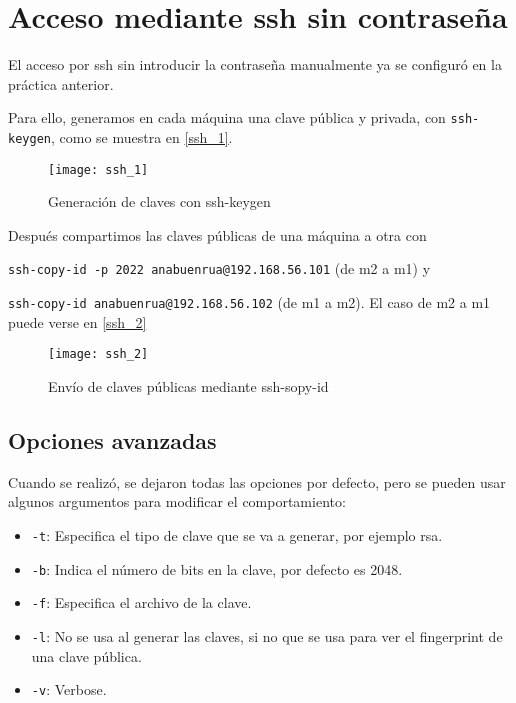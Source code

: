 \chapter{Acceso mediante ssh sin contraseña}

El acceso por ssh sin introducir la contraseña manualmente ya se configuró en la práctica anterior.

Para ello, generamos en cada máquina una clave pública y privada, con \verb|ssh-keygen|, como se muestra en \eqref{ssh_1}.

\begin{figure}[h!]
\begin{center}
\caption{Generación de claves con ssh-keygen}
\label{ssh_1}
\texttt{[image: ssh\_1]}
\end{center}
\end{figure}

Después compartimos las claves públicas de una máquina a otra con 

\verb|ssh-copy-id -p 2022 anabuenrua@192.168.56.101| (de m2 a m1) y

\verb|ssh-copy-id anabuenrua@192.168.56.102| (de m1 a m2). El caso de m2 a m1 puede verse en \eqref{ssh_2}

\begin{figure}[h!]
\begin{center}
\caption{Envío de claves públicas mediante ssh-sopy-id}
\label{ssh_2}
\texttt{[image: ssh\_2]}
\end{center}
\end{figure}

\section{Opciones avanzadas}

Cuando se realizó, se dejaron todas las opciones por defecto, pero se pueden usar algunos argumentos para modificar el comportamiento:

\begin{itemize}
\item \verb|-t|: Especifica el tipo de clave que se va a generar, por ejemplo rsa.
\item \verb|-b|: Indica el número de bits en la clave, por defecto es 2048.
\item \verb|-f|: Especifica el archivo de la clave.
\item \verb|-l|: No se usa al generar las claves, si no que se usa para ver el fingerprint de una clave pública.
\item \verb|-v|: Verbose.
\end{itemize}


